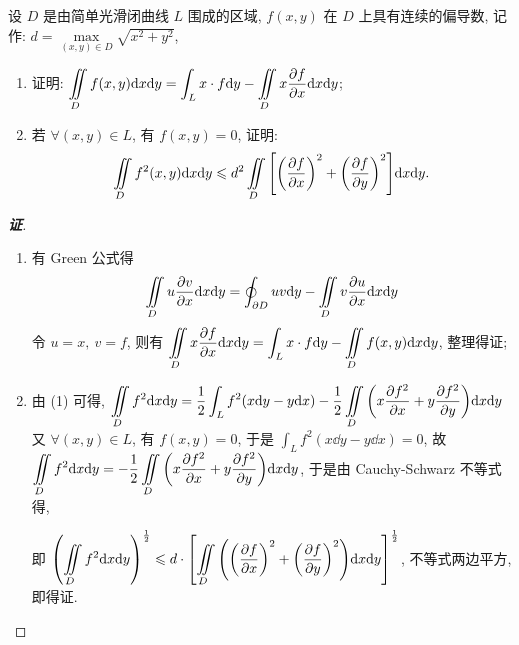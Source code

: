 \begin{example}[2023 西北大学]
    设 $D$ 是由简单光滑闭曲线 $L$ 围成的区域, $f(x,y)$ 在 $D$ 上具有连续的偏导数, 记作: $d=\max\limits_{(x,y)\in D}\sqrt{x^2+y^2}$,
    \begin{enumerate}[label=(\arabic{*})]
        \item 证明: $\displaystyle \iint\limits_D f(x,y)\dd x\dd y=\int_L x\cdot f \dd y-\iint\limits_Dx\pdv{f}{x}\dd x\dd y$;
        \item 若 $\forall (x,y)\in L$, 有 $f(x,y)=0$, 证明:
              $$\iint\limits_D f^2(x,y)\dd x\dd y\leqslant d^2\iint\limits_D\qty[\qty(\pdv{f}{x})^2+\qty(\pdv{f}{y})^2]\dd x\dd y.$$
    \end{enumerate}
\end{example}
\begin{proof}[{\songti \textbf{证}}]
    \begin{enumerate}[label=(\arabic{*})]
        \item 有 Green 公式得 $$\iint\limits_Du\pdv{v}{x}\dd x\dd y=\oint_{\partial D}uv\dd y-\iint\limits_Dv\pdv{u}{x}\dd x\dd y$$
              令 $u=x,~v=f$, 则有 $\displaystyle\iint\limits_Dx\pdv{f}{x}\dd x\dd y=\int_Lx\cdot f\dd y-\iint\limits_Df(x,y)\dd x\dd y$, 整理得证;
        \item 由 (1) 可得, $\displaystyle \iint\limits_D f^2\dd x\dd y=\dfrac{1}{2}\int_L f^2(x\dd y-y\dd x)-\dfrac{1}{2}\iint\limits_D\qty(x\pdv{f^2}{x}+y\pdv{f^2}{y})\dd x\dd y$
              又 $\forall (x,y)\in L$, 有 $f(x,y)=0$, 于是 $\displaystyle \int_Lf^2(x\dd y-y\dd x)=0$, 故 $\displaystyle \iint\limits_D f^2\dd x\dd y=-\dfrac{1}{2}\iint\limits_D\qty(x\pdv{f^2}{x}+y\pdv{f^2}{y})\dd x\dd y$,
              于是由 Cauchy-Schwarz 不等式得,
              即 $\displaystyle \qty(\iint\limits_Df^2\dd x\dd y)^{\frac{1}{2}}\leqslant d\cdot\qty[\iint\limits_D \qty(\qty(\pdv{f}{x})^2+\qty(\pdv{f}{y})^2)\dd x\dd y]^{\frac{1}{2}}$, 不等式两边平方, 即得证.
    \end{enumerate}
\end{proof}

